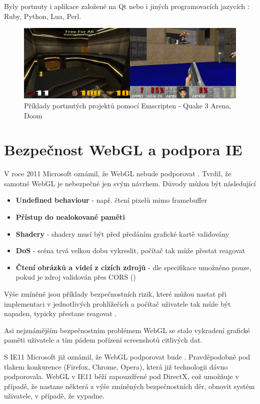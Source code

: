 \documentclass[12pt,a4paper,titlepage,final]{report}
\begin{document}
Byly portnuty i aplikace založené na Qt nebo i jiných programovacích jazycích \cite{portex}: Ruby, Python, Lua, Perl.

\begin{figure}[ht]
\begin{center}
\includegraphics[width=14cm]{images/quakedoom.jpg}
\caption{Příklady portnutých projektů pomocí Emscripten - Quake 3 Arena, Doom}
\label{fig:theory}
\end{center}
\end{figure}

\section{Bezpečnost WebGL a podpora IE}

V roce 2011 Microsoft oznámil, že WebGL nebude podporovat \cite{arstechnica}. Tvrdil, že samotné WebGL je nebezpečné jen svým návrhem. Důvody můžou být následující

\begin{itemize}
	\item \textbf{Undefined behaviour} - např. čtení pixelů mimo framebuffer
	\item \textbf{Přístup do nealokované paměti}
	\item \textbf{Shadery} - shadery musí být před předáním grafické kartě validovány
	\item \textbf{DoS} - scéna trvá velkou dobu vykreslit, počítač tak může přestat reagovat
	\item \textbf{Čtení obrázků a videí z cizích zdrojů} - dle specifikace umožněno pouze, pokud je zdroj validován přes CORS (\cite{cors})
\end{itemize}

Výše zmíněné jsou příklady bezpečnostních rizik, které můžou nastat při implementaci v jednotlivých prohlížečích a počítač uživatele tak může být napaden, typicky přestane reagovat \cite{security}.

Asi nejznámějším bezpečnostním problémem WebGL se stalo vykradení grafické paměti uživatele \cite{gstealing} a tím pádem pořízení screenshotů citlivých dat.

S IE11 Microsoft již oznámil, že WebGL podporovat bude \cite{ie11}. Pravděpodobně pod tlakem konkurence (Firefox, Chrome, Opera), která již technologii dávno podporovala. WebGL v IE11 běží zapouzdřené pod DirectX, což umožňuje v případě, že nastane některá z výše zmíněných bezpečnostních děr, obnovit systém uživatele, v případě, že vypadne.
	



\nocite{comparison}
\nocite{comparison2d}
\nocite{comparison-book}
\nocite{choose-api}
\nocite{engines}


\hypertarget{bib}{}

\end{document}
